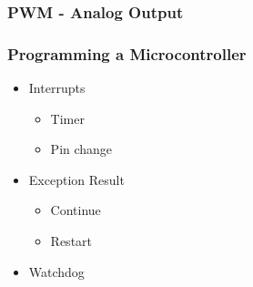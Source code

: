 \frame
{
\frametitle{PWM - Analog Output}
\resizebox{\textwidth}{0.9\textheight}{

}
}


\frame
{
\frametitle{Programming a Microcontroller}

\begin{itemize}
\item Interrupts
	\begin{itemize}
	\item Timer
	\item Pin change
	\end{itemize}
\item Exception Result
	\begin{itemize}
	\item Continue
	\item Restart
	\end{itemize}
\item Watchdog
\end{itemize}
}
